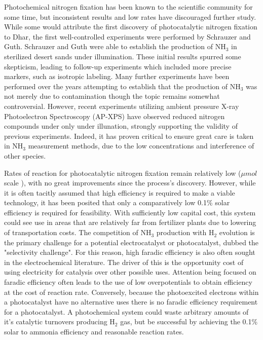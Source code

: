 \documentclass[catalysts,article,submit,moreauthors,pdftex,10pt,a4paper]{mdpi}
\theoremstyle{mdpi}
\newcounter{ex}
\newcounter{re}
\theoremstyle{mdpidefinition}
\begin{document}
Photochemical nitrogen fixation has been known to the scientific community for some time, but inconsistent results and low rates have discouraged further study.\cite{Medford_2017} While some would attribute the first discovery of photocatalytic nitrogen fixation to Dhar,\cite{Dhar_1941} the first well-controlled experiments were performed by Schrauzer and Guth.\cite{Schrauzer_1977} Schrauzer and Guth were able to establish the production of NH$_3$ in sterilized desert sands under illumination. These initial results spurred some skepticism, leading to follow-up experiments which included more precise markers, such as isotropic labeling.\cite{Schrauzer_1983} Many further experiments have been performed over the years attempting to establish that the production of NH$_3$ was not merely due to contamination\cite{Bickley_1979,Augugliaro_1982,Soria_1991,Li_2018,Yuan_2013,Hirakawa_2017} though the topic remains somewhat controversial. However, recent experiments utilizing ambient pressure X-ray Photoelectron Spectroscopy (AP-XPS) have observed reduced nitrogen compounds under only under illunation, strongly supporting the validity of previous experiments.\cite{Comer_2018b} Indeed, it has proven critical to ensure great care is taken in NH$_3$ measurement methods, due to the low concentrations and interference of other species.\cite{Gao_2018,Cui2018}


Rates of reaction for photocatalytic nitrogen fixation remain relatively low ($\mu mol$ scale \cite{Hirakawa_2017}), with no great improvements since the process's discovery. However, while it is often tacitly assumed that high efficiency is required to make a viable technology, it has been posited that only a comparatively low 0.1\% solar efficiency is required for feasibility.\cite{Comer_2019,Medford_2017} With sufficiently low capital cost, this system could see use in areas that are relatively far from fertilizer plants due to lowering of transportation costs. The competition of NH$_3$ production with H$_2$ evolution is the primary challenge for a potential electrocatalyst or photocatalyst, dubbed the "selectivity challenge".\cite{Singh_2017} For this reason, high faradic efficiency is also often sought in the electrochemical literature.\cite{McPherson_2019} The driver of this is the opportunity cost of using electricity for catalysis over other possible uses. Attention being focused on faradic efficiency often leads to the use of low overpotentials to obtain efficiency at the cost of reaction rate. Conversely, because the photoexcited electrons within a photocatalyst have no alternative uses there is no faradic efficiency requirement for a photocatalyst. A photochemical system could waste arbitrary amounts of it's catalytic turnovers producing H$_2$ gas, but be successful by achieving the 0.1\% solar to ammonia efficiency and reasonable reaction rates. %
\end{document}
